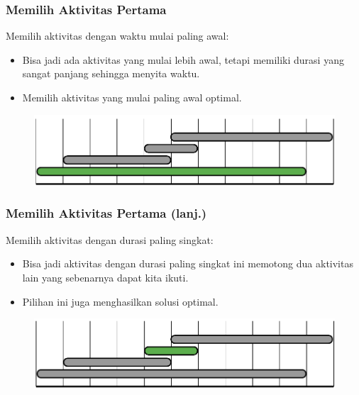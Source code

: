 \begin{frame}
  \frametitle{Memilih Aktivitas Pertama}
  Memilih aktivitas dengan waktu mulai paling awal:
  \begin{itemize}
    \item Bisa jadi ada aktivitas yang mulai lebih awal, tetapi memiliki durasi yang sangat panjang sehingga menyita waktu.
    \item Memilih aktivitas yang mulai paling awal  optimal.
  \end{itemize}

  \begin{figure}
    \includegraphics[width=9 cm]{asset/activity-selection-choice-1.pdf}
  \end{figure}
\end{frame}

\begin{frame}
  \frametitle{Memilih Aktivitas Pertama (lanj.)}
  Memilih aktivitas dengan durasi paling singkat:
  \begin{itemize}
    \item Bisa jadi aktivitas dengan durasi paling singkat ini memotong dua aktivitas lain yang sebenarnya dapat kita ikuti.
    \item Pilihan ini juga  menghasilkan solusi optimal.
  \end{itemize}

  \begin{figure}
    \includegraphics[width=9 cm]{asset/activity-selection-choice-2.pdf}
  \end{figure}
\end{frame}

